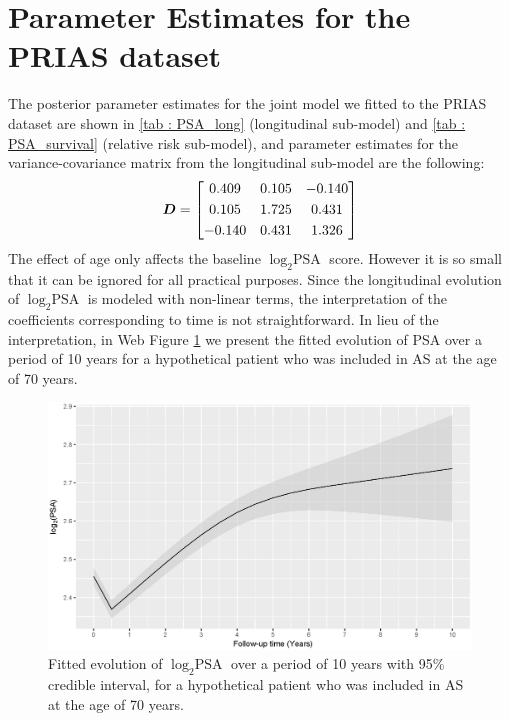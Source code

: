 
\section{Parameter Estimates for the PRIAS dataset}
\label{sec : param_estimates_jm_fit_prias}
The posterior parameter estimates for the joint model we fitted to the PRIAS dataset are shown in \ref{tab : PSA_long} (longitudinal sub-model) and \ref{tab : PSA_survival} (relative risk sub-model), and parameter estimates for the variance-covariance matrix from the longitudinal sub-model are the following:
\begin{equation*}
\boldsymbol{D} = \begin{bmatrix}
       0.409 & 0.105 & -0.140 \\[0.3em]
       0.105 & 1.725 & 0.431 \\[0.3em]
       -0.140 & 0.431 & 1.326
     \end{bmatrix}
\end{equation*} 
The effect of age only affects the baseline $\log_2 \mbox{PSA}$ score. However it is so small that it can be ignored for all practical purposes. Since the longitudinal evolution of $\log_2 \mbox{PSA}$ is modeled with non-linear terms, the interpretation of the coefficients corresponding to time is not straightforward. In lieu of the interpretation, in Web Figure \ref{fig : fitted_trend_psa} we present the fitted evolution of PSA over a period of 10 years for a hypothetical patient who was included in AS at the age of 70 years.

\begin{figure}[!htb]
\centerline{\includegraphics[width=\columnwidth]{images/model_fit/marginal_fitted_psa_normal.eps}}
\caption{Fitted evolution of $\log_2 \mbox{PSA}$ over a period of 10 years with 95\% credible interval, for a hypothetical patient who was included in AS at the age of 70 years.}
\label{fig : fitted_trend_psa}
\end{figure}

